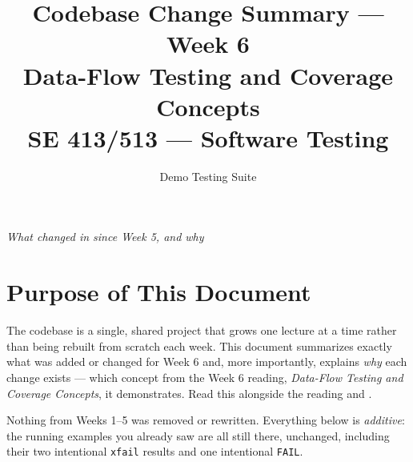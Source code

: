 \documentclass[11pt]{article}
\title{
  \textbf{Codebase Change Summary --- Week 6}\\[4pt]
  \large Data-Flow Testing and Coverage Concepts\\[2pt]
  \normalsize SE 413/513 --- Software Testing
}
\author{Demo Testing Suite}
\date{}
\begin{document}
\maketitle

\begin{center}
\textit{What changed in  since Week 5, and why}
\end{center}

\vspace{0.3cm}

\section{Purpose of This Document}
The  codebase is a single, shared project that
grows one lecture at a time rather than being rebuilt from scratch each
week. This document summarizes exactly what was added or changed for
Week 6 and, more importantly, explains \emph{why} each change exists ---
which concept from the Week 6 reading, \textit{Data-Flow Testing and
Coverage Concepts}, it demonstrates. Read this alongside the reading and
.

\begin{keyidea}
Nothing from Weeks 1--5 was removed or rewritten. Everything below is
\emph{additive}: the running examples you already saw are all still
there, unchanged, including their two intentional \texttt{xfail} results
and one intentional \texttt{FAIL}.
\end{keyidea}

\end{document}
